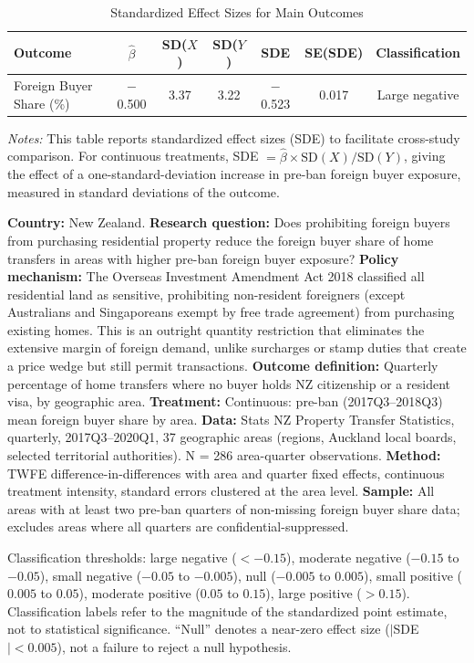 \begin{table}[H]
\centering
\caption{Standardized Effect Sizes for Main Outcomes}
\label{tab:sde}
\begin{tabular}{lcccccc}
\toprule
Outcome & $\hat{\beta}$ & SD($X$) & SD($Y$) & SDE & SE(SDE) & Classification \\
\midrule
Foreign Buyer Share (\%) & $-$0.500 & 3.37 & 3.22 & $-$0.523 & 0.017 & Large negative \\
\bottomrule
\end{tabular}
\par\vspace{0.3em}
{\footnotesize \emph{Notes:} This table reports standardized effect sizes (SDE) to facilitate cross-study comparison.
For continuous treatments, SDE $= \hat{\beta} \times \text{SD}(X) / \text{SD}(Y)$, giving the effect of a one-standard-deviation increase in pre-ban foreign buyer exposure, measured in standard deviations of the outcome.

\textbf{Country:} New Zealand.
\textbf{Research question:} Does prohibiting foreign buyers from purchasing residential property reduce the foreign buyer share of home transfers in areas with higher pre-ban foreign buyer exposure?
\textbf{Policy mechanism:} The Overseas Investment Amendment Act 2018 classified all residential land as sensitive, prohibiting non-resident foreigners (except Australians and Singaporeans exempt by free trade agreement) from purchasing existing homes. This is an outright quantity restriction that eliminates the extensive margin of foreign demand, unlike surcharges or stamp duties that create a price wedge but still permit transactions.
\textbf{Outcome definition:} Quarterly percentage of home transfers where no buyer holds NZ citizenship or a resident visa, by geographic area.
\textbf{Treatment:} Continuous: pre-ban (2017Q3--2018Q3) mean foreign buyer share by area.
\textbf{Data:} Stats NZ Property Transfer Statistics, quarterly, 2017Q3--2020Q1, 37 geographic areas (regions, Auckland local boards, selected territorial authorities). N = 286 area-quarter observations.
\textbf{Method:} TWFE difference-in-differences with area and quarter fixed effects, continuous treatment intensity, standard errors clustered at the area level.
\textbf{Sample:} All areas with at least two pre-ban quarters of non-missing foreign buyer share data; excludes areas where all quarters are confidential-suppressed.

Classification thresholds: large negative ($< -0.15$), moderate negative ($-0.15$ to $-0.05$), small negative ($-0.05$ to $-0.005$), null ($-0.005$ to $0.005$), small positive ($0.005$ to $0.05$), moderate positive ($0.05$ to $0.15$), large positive ($> 0.15$).
Classification labels refer to the magnitude of the standardized point estimate, not to statistical significance. ``Null'' denotes a near-zero effect size ($|$SDE$| < 0.005$), not a failure to reject a null hypothesis.}
\end{table}
